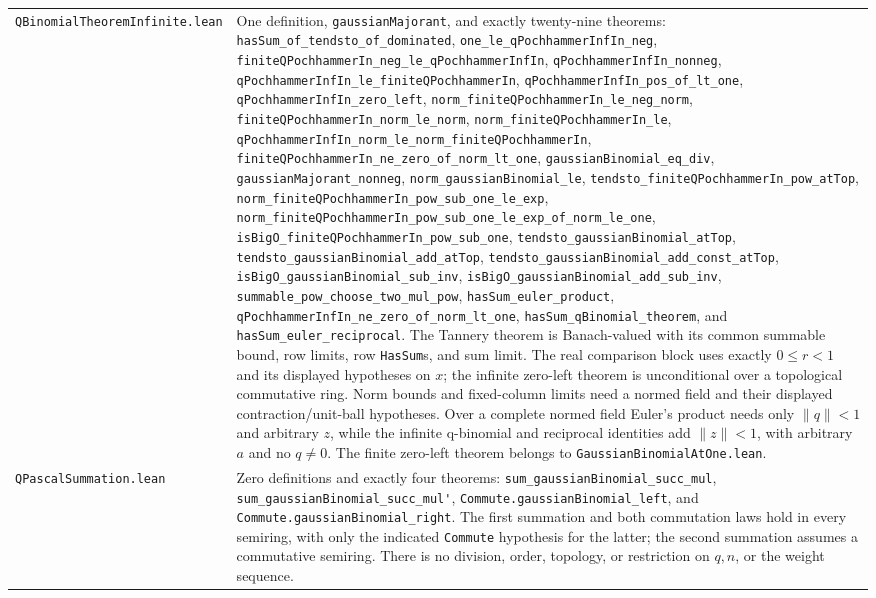 \documentclass[11pt,oneside]{article}
\theoremstyle{definition}
\theoremstyle{remark}
\begin{document}
\begin{longtable}{>{\raggedright\arraybackslash}p{} >{\raggedright\arraybackslash}p{}}
\nolinkurl{QBinomialTheoremInfinite.lean} & One definition, \nolinkurl{gaussianMajorant}, and exactly twenty-nine theorems: \nolinkurl{hasSum_of_tendsto_of_dominated}, \nolinkurl{one_le_qPochhammerInfIn_neg}, \nolinkurl{finiteQPochhammerIn_neg_le_qPochhammerInfIn}, \nolinkurl{qPochhammerInfIn_nonneg}, \nolinkurl{qPochhammerInfIn_le_finiteQPochhammerIn}, \nolinkurl{qPochhammerInfIn_pos_of_lt_one}, \nolinkurl{qPochhammerInfIn_zero_left}, \nolinkurl{norm_finiteQPochhammerIn_le_neg_norm}, \nolinkurl{finiteQPochhammerIn_norm_le_norm}, \nolinkurl{norm_finiteQPochhammerIn_le}, \nolinkurl{qPochhammerInfIn_norm_le_norm_finiteQPochhammerIn}, \nolinkurl{finiteQPochhammerIn_ne_zero_of_norm_lt_one}, \nolinkurl{gaussianBinomial_eq_div}, \nolinkurl{gaussianMajorant_nonneg}, \nolinkurl{norm_gaussianBinomial_le}, \nolinkurl{tendsto_finiteQPochhammerIn_pow_atTop}, \nolinkurl{norm_finiteQPochhammerIn_pow_sub_one_le_exp}, \nolinkurl{norm_finiteQPochhammerIn_pow_sub_one_le_exp_of_norm_le_one}, \nolinkurl{isBigO_finiteQPochhammerIn_pow_sub_one}, \nolinkurl{tendsto_gaussianBinomial_atTop}, \nolinkurl{tendsto_gaussianBinomial_add_atTop}, \nolinkurl{tendsto_gaussianBinomial_add_const_atTop}, \nolinkurl{isBigO_gaussianBinomial_sub_inv}, \nolinkurl{isBigO_gaussianBinomial_add_sub_inv}, \nolinkurl{summable_pow_choose_two_mul_pow}, \nolinkurl{hasSum_euler_product}, \nolinkurl{qPochhammerInfIn_ne_zero_of_norm_lt_one}, \nolinkurl{hasSum_qBinomial_theorem}, and \nolinkurl{hasSum_euler_reciprocal}.  The Tannery theorem is Banach-valued with its common summable bound, row limits, row \texttt{HasSum}s, and sum limit.  The real comparison block uses exactly \(0\le r<1\) and its displayed hypotheses on \(x\); the infinite zero-left theorem is unconditional over a topological commutative ring.  Norm bounds and fixed-column limits need a normed field and their displayed contraction/unit-ball hypotheses.  Over a complete normed field Euler's product needs only \(\lVert q\rVert<1\) and arbitrary \(z\), while the infinite q-binomial and reciprocal identities add \(\lVert z\rVert<1\), with arbitrary \(a\) and no \(q\ne0\).  The finite zero-left theorem belongs to \nolinkurl{GaussianBinomialAtOne.lean}. \\
\nolinkurl{QPascalSummation.lean} & Zero definitions and exactly four theorems: \nolinkurl{sum_gaussianBinomial_succ_mul}, \nolinkurl{sum_gaussianBinomial_succ_mul'}, \nolinkurl{Commute.gaussianBinomial_left}, and \nolinkurl{Commute.gaussianBinomial_right}.  The first summation and both commutation laws hold in every semiring, with only the indicated \texttt{Commute} hypothesis for the latter; the second summation assumes a commutative semiring.  There is no division, order, topology, or restriction on \(q,n\), or the weight sequence. \\

\end{longtable}
\end{document}
